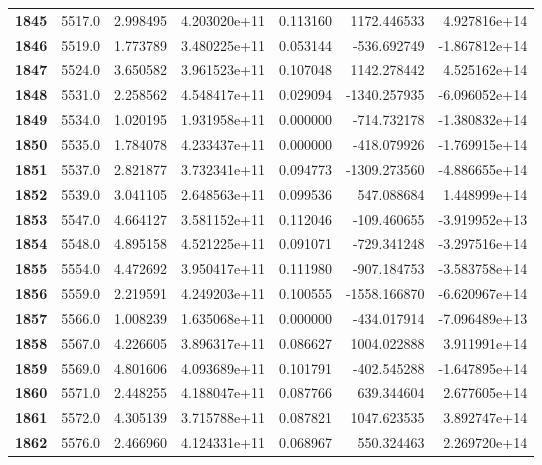 \documentclass{report}[12pt]
\begin{document}
\begin{center}
\begin{tabular}{lrrrrrr}
\textbf{1845} &         5517.0 &   2.998495 &  4.203020e+11 &    0.113160 &  1172.446533 &  4.927816e+14 \\
\textbf{1846} &         5519.0 &   1.773789 &  3.480225e+11 &    0.053144 &  -536.692749 & -1.867812e+14 \\
\textbf{1847} &         5524.0 &   3.650582 &  3.961523e+11 &    0.107048 &  1142.278442 &  4.525162e+14 \\
\textbf{1848} &         5531.0 &   2.258562 &  4.548417e+11 &    0.029094 & -1340.257935 & -6.096052e+14 \\
\textbf{1849} &         5534.0 &   1.020195 &  1.931958e+11 &    0.000000 &  -714.732178 & -1.380832e+14 \\
\textbf{1850} &         5535.0 &   1.784078 &  4.233437e+11 &    0.000000 &  -418.079926 & -1.769915e+14 \\
\textbf{1851} &         5537.0 &   2.821877 &  3.732341e+11 &    0.094773 & -1309.273560 & -4.886655e+14 \\
\textbf{1852} &         5539.0 &   3.041105 &  2.648563e+11 &    0.099536 &   547.088684 &  1.448999e+14 \\
\textbf{1853} &         5547.0 &   4.664127 &  3.581152e+11 &    0.112046 &  -109.460655 & -3.919952e+13 \\
\textbf{1854} &         5548.0 &   4.895158 &  4.521225e+11 &    0.091071 &  -729.341248 & -3.297516e+14 \\
\textbf{1855} &         5554.0 &   4.472692 &  3.950417e+11 &    0.111980 &  -907.184753 & -3.583758e+14 \\
\textbf{1856} &         5559.0 &   2.219591 &  4.249203e+11 &    0.100555 & -1558.166870 & -6.620967e+14 \\
\textbf{1857} &         5566.0 &   1.008239 &  1.635068e+11 &    0.000000 &  -434.017914 & -7.096489e+13 \\
\textbf{1858} &         5567.0 &   4.226605 &  3.896317e+11 &    0.086627 &  1004.022888 &  3.911991e+14 \\
\textbf{1859} &         5569.0 &   4.801606 &  4.093689e+11 &    0.101791 &  -402.545288 & -1.647895e+14 \\
\textbf{1860} &         5571.0 &   2.448255 &  4.188047e+11 &    0.087766 &   639.344604 &  2.677605e+14 \\
\textbf{1861} &         5572.0 &   4.305139 &  3.715788e+11 &    0.087821 &  1047.623535 &  3.892747e+14 \\
\textbf{1862} &         5576.0 &   2.466960 &  4.124331e+11 &    0.068967 &   550.324463 &  2.269720e+14 \\

\end{tabular}
\end{center}
\end{document}
